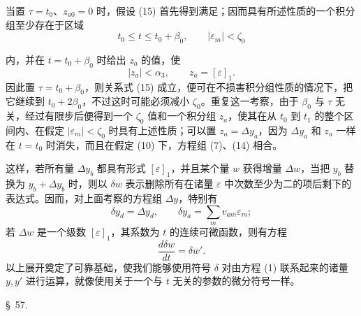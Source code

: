 \documentclass[11pt,a4paper,leqno]{article}
\begin{document}
当置 $\tau=t_0$、$z_{a0}=0$ 时，假设 (15) 首先得到满足；因而具有所述性质的一个积分组至少存在于区域
\[
t_0\leq t\leq t_0+\beta_0,\qquad |\varepsilon_m|<\zeta_0
\]

内，并在 $t=t_0+\beta_0$ 时给出 $z_a$ 的值，使
\[
|z_a|<\alpha_3,\qquad z_a=[\varepsilon]_1.
\]
因此置 $\tau=t_0+\beta_0$，则关系式 (15) 成立，便可在不损害积分组性质的情况下，把它继续到 $t_0+2\beta_0$，不过这时可能必须减小 $\zeta_0$。重复这一考察，由于 $\beta_0$ 与 $\tau$ 无关，经过有限步后便得到一个 $\zeta_0$ 值和一个积分组 $z_a$，使其在从 $t_0$ 到 $t_1$ 的整个区间内、在假定 $|\varepsilon_m|<\zeta_0$ 时具有上述性质；可以置 $z_a=\Delta y_a$，因为 $\Delta y_a$ 和 $z_a$ 一样在 $t=t_0$ 时消失，而且在假定 (10) 下，方程组 (7)、(14) 相合。

这样，若所有量 $\Delta y_b$ 都具有形式 $[\varepsilon]_1$，并且某个量 $w$ 获得增量 $\Delta w$，当把 $y_b$ 替换为 $y_b+\Delta y_b$ 时，则以 $\delta w$ 表示删除所有在诸量 $\varepsilon$ 中次数至少为二的项后剩下的表达式。因而，对上面考察的方程组 $\Delta y$，特别有
\[
\delta y_d=\Delta y_d,\qquad
\delta y_a=\sum_m v_{am}\varepsilon_m;
\]
若 $\Delta w$ 是一个级数 $[\varepsilon]_1$，其系数为 $t$ 的连续可微函数，则有方程
\[
\frac{d\delta w}{dt}=\delta w'.
\]
以上展开奠定了可靠基础，使我们能够使用符号 $\delta$ 对由方程 (1) 联系起来的诸量 $y,y'$ 进行运算，就像使用关于一个与 $t$ 无关的参数的微分符号一样。


\begin{center}
{\large \S~57.}
\end{center}
\end{document}
